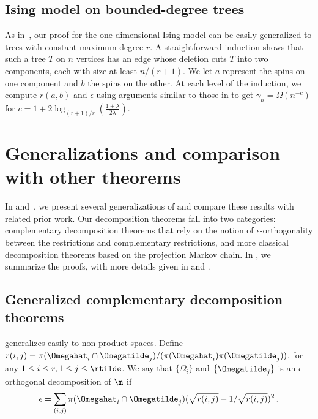 \documentclass{toc}
\begin{document}
%
\subsection{Ising model on bounded-degree trees}  %

As in~\cite{jstv04}, our proof for the one-dimensional Ising model can 
be easily generalized to trees with constant maximum degree $r$.  A 
straightforward induction shows that such a tree $T$ on $n$ vertices 
has an edge whose deletion cuts $T$ into two components, each with size 
at least $n/(r+1)$. We let $a$ represent the spins on one component and 
$b$ the spins on the other. At each level of the induction, we compute 
$r(a,b)$ and $\epsilon$ using arguments similar to those in 
 to get $\gamma_n = \Omega(n^{-c})$ for $c = 1 
+ 2\log_{(r+1)/r}\left(\frac{1+\lambda}{2\lambda}\right)$. 

\section{Generalizations and comparison with other theorems}\label{sec:generalizations}

In  and~, we present 
several generalizations of  and compare 
these results with related prior work.  Our decomposition theorems fall 
into two categories: complementary decomposition theorems that rely on 
the notion of $\epsilon$-orthogonality between the restrictions and 
complementary restrictions, and more classical decomposition theorems 
based on the projection Markov chain.  In , we 
summarize the proofs, with more details given in  and .

\subsection{Generalized complementary decomposition theorems}\label{sec:gencomp}

 generalizes easily to non-product spaces.  
Define $r(i,j)=\pi(\Omegahat_i\cap\Omegatilde_j)/(\pi(\Omegahat_i)\pi(\Omegatilde_j))$, 
for any $1\leq i\leq r, 1\leq j\leq \rtilde$.
We say that $\{\Omega_i\}$ and $\{\Omegatilde_j\}$
is an $\epsilon$-orthogonal decomposition of $\m$ if
\begin{equation*}
  \epsilon=  \sum_{(i,j)}\pi(\Omegahat_i\cap\Omegatilde_j)(\sqrt{r(i,j)}-1/\sqrt{r(i,j)})^2\,.
\end{equation*}
\end{document}
